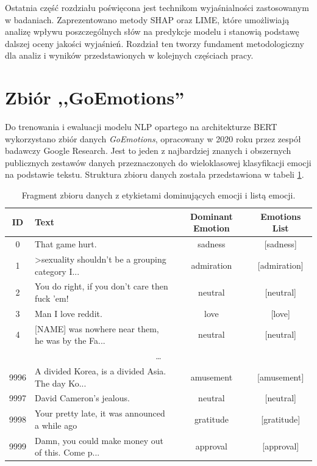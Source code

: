 \documentclass[wmii, inf, mgr]{uwmthesis}
\begin{document}
Ostatnia część rozdziału poświęcona jest technikom wyjaśnialności zastosowanym w badaniach. Zaprezentowano metody SHAP oraz LIME, które umożliwiają analizę wpływu poszczególnych słów na predykcje modelu i stanowią podstawę dalszej oceny jakości wyjaśnień. Rozdział ten tworzy fundament metodologiczny dla analiz i wyników przedstawionych w kolejnych częściach pracy.

\section{Zbiór ,,GoEmotions''}
Do trenowania i ewaluacji modelu NLP opartego na architekturze BERT wykorzystano zbiór danych \textit{GoEmotions}, opracowany w 2020 roku przez zespół badawczy Google Research. Jest to jeden z najbardziej znanych i obszernych publicznych zestawów danych przeznaczonych do wieloklasowej klasyfikacji emocji na podstawie tekstu. Struktura zbioru danych została przedstawiona w tabeli \ref{tab:structure_goEmotions}.

\newpage
\begin{table}[h!]
	\centering
	\renewcommand{\arraystretch}{1.1}
	\small
	\begin{tabularx}{0.9\textwidth}{|c|X|c|c|}
		\hline
		\textbf{ID} & \textbf{Text} & \textbf{Dominant Emotion} & \textbf{Emotions List} \\ \hline
		0 & That game hurt. & sadness & [sadness] \\ \hline
		1 & >sexuality shouldn't be a grouping category I... & admiration & [admiration] \\ \hline
		2 & You do right, if you don't care then fuck 'em! & neutral & [neutral] \\ \hline
		3 & Man I love reddit. & love & [love] \\ \hline
		4 & [NAME] was nowhere near them, he was by the Fa... & neutral & [neutral] \\ \hline
		\multicolumn{4}{|c|}{\dots} \\ \hline
		9996 & A divided Korea, is a divided Asia. The day Ko... & amusement & [amusement] \\ \hline
		9997 & David Cameron's jealous. & neutral & [neutral] \\ \hline
		9998 & Your pretty late, it was announced a while ago & gratitude & [gratitude] \\ \hline
		9999 & Damn, you could make money out of this. Come p... & approval & [approval] \\ \hline
	\end{tabularx}
	\caption{Fragment zbioru danych z etykietami dominujących emocji i listą emocji.}
	\label{tab:structure_goEmotions}
\end{table}
\end{document}
